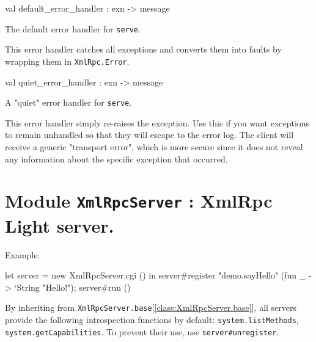 \documentclass[11pt]{article}
\begin{document}
\label{val:XmlRpc.default-underscoreerror-underscorehandler}\begin{ocamldoccode}
val default_error_handler : exn -> message
\end{ocamldoccode}
\begin{ocamldocdescription}
The default error handler for {\tt{serve}}.


    This error handler catches all exceptions and converts them into
    faults by wrapping them in {\tt{XmlRpc.Error}}.


\end{ocamldocdescription}




\label{val:XmlRpc.quiet-underscoreerror-underscorehandler}\begin{ocamldoccode}
val quiet_error_handler : exn -> message
\end{ocamldoccode}
\begin{ocamldocdescription}
A "quiet" error handler for {\tt{serve}}.


    This error handler simply re-raises the exception. Use this if you
    want exceptions to remain unhandled so that they will escape to the
    error log. The client will receive a generic "transport error",
    which is more secure since it does not reveal any information about
    the specific exception that occurred.


\end{ocamldocdescription}


\section{Module {\tt{XmlRpcServer}} : XmlRpc Light server.}
\label{module:XmlRpcServer}




\ocamldocvspace{0.5cm}



Example: \begin{ocamldoccode}

    let server = new XmlRpcServer.cgi () in
    server#register "demo.sayHello"
      (fun _ -> `String "Hello!");
    server#run () 
\end{ocamldoccode}



    By inheriting from {\tt{XmlRpcServer.base}}[\ref{class:XmlRpcServer.base}], all servers provide
    the following introspection functions by default: {\tt{system.listMethods}},
    {\tt{system.getCapabilities}}. To prevent their use, use {\tt{server\verb`#`unregister}}.
\end{document}
